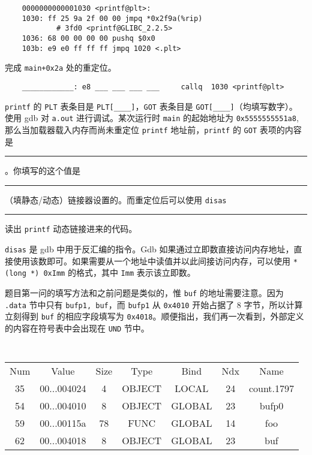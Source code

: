 \begin{problems}
\begin{verbatim}
    0000000000001030 <printf@plt>:
    1030: ff 25 9a 2f 00 00 jmpq *0x2f9a(%rip)
            # 3fd0 <printf@GLIBC_2.2.5>
    1036: 68 00 00 00 00 pushq $0x0
    103b: e9 e0 ff ff ff jmpq 1020 <.plt>
        \end{verbatim}
            \subqn 完成 \verb|main+0x2a| 处的重定位。
            \begin{verbatim}
    ____________: e8 ___ ___ ___ ___     callq  1030 <printf@plt>
            \end{verbatim}
            \subqn \verb|printf| 的 \verb|PLT| 表条目是 \verb|PLT[____]|，\verb|GOT| 表条目是 \verb|GOT[____]|（均填写数字）。
            \subqn 使用 gdb 对 \verb|a.out| 进行调试。某次运行时 \verb|main| 的起始地址为 \verb|0x5555555551a8|, 那么当加载器载入内存而尚未重定位 \verb|printf| 地址前，\verb|printf| 的 \verb|GOT| 表项的内容是 \rule{2.5cm}{0.25mm}。你填写的这个值是 \rule{2.5cm}{0.25mm}（填静态/动态）链接器设置的。而重定位后可以使用 \verb|disas| \rule{2.5cm}{0.25mm} 读出 \verb|printf| 动态链接进来的代码。
            \begin{hint}
                \verb|disas| 是 gdb 中用于反汇编的指令。Gdb 如果通过立即数直接访问内存地址，直接使用该数即可。如果需要从一个地址中读值并以此间接访问内存，可以使用 \verb|*(long *) 0xImm| 的格式，其中 \verb|Imm| 表示该立即数。
            \end{hint}
        \sol 题目第一问的填写方法和之前问题是类似的，惟 \verb|buf| 的地址需要注意。因为 \verb|.data| 节中只有 \verb|bufp1, buf|，而 \verb|bufp1| 从 \verb|0x4010| 开始占据了 8 字节，所以计算立刻得到 \verb|buf| 的相应字段填写为 \verb|0x4018|。顺便指出，我们再一次看到，外部定义的内容在符号表中会出现在 \verb|UND| 节中。
        \begin{table}[H]
            \tt
            \centering
            \begin{tabular}{ccccccc}
                \hline
                \multicolumn{1}{|c}{Num} & Value & Size & Type & Bind & Ndx & \multicolumn{1}{c|}{Name} \\
                \multicolumn{1}{|c}{35} & 00...004024 & 4 & OBJECT & LOCAL & 24 & \multicolumn{1}{c|}{count.1797} \\
                \multicolumn{1}{|c}{54} & 00...004010 & 8 & OBJECT & GLOBAL & 23 & \multicolumn{1}{c|}{bufp0} \\
                \multicolumn{1}{|c}{59} & 00...00115a & 78 & FUNC & GLOBAL & 14 & \multicolumn{1}{c|}{foo} \\
                \multicolumn{1}{|c}{62} & 00...004018 & 8 & OBJECT & GLOBAL & 23 & \multicolumn{1}{c|}{buf} \\

\end{tabular}
\end{table}
\end{problems}
